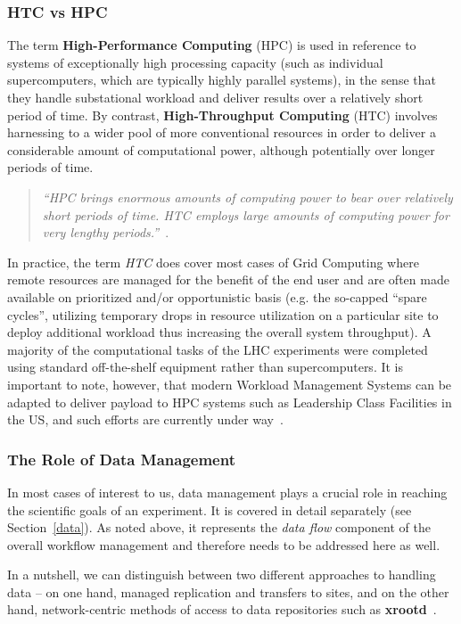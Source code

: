 \subsubsection{HTC vs HPC}
The term \textbf{High-Performance Computing} (HPC) is used in reference to systems of exceptionally high processing capacity (such as individual supercomputers, which are typically highly parallel systems),
in the sense that they handle substational workload and deliver results over a relatively short period of time. By contrast,\textbf{ High-Throughput Computing} (HTC) involves harnessing to a wider pool
of more conventional resources in order to deliver a considerable amount of computational power, although potentially over longer periods of time. 
\begin{quote}
\textit{``HPC brings enormous amounts of computing power to bear over relatively short periods of time. HTC employs large amounts of computing power for very lengthy periods.''}~\cite{htc}.
\end{quote}

In practice, the term \textit{HTC} does cover most cases of Grid Computing where remote resources are managed for the benefit of the end user and are often made available on prioritized and/or
opportunistic basis (e.g. the so-capped ``spare cycles'', utilizing temporary drops in resource utilization on a particular site to deploy additional workload thus increasing the overall system
throughput). A majority of the computational tasks of the LHC experiments were completed using standard off-the-shelf equipment rather than supercomputers. It is important to note, however,
that modern Workload Management Systems can be adapted to deliver payload to HPC systems such as Leadership Class Facilities in the US, and such efforts are currently under way~\cite{panda_chep13}.

\subsubsection{The Role of Data Management}
In most cases of interest to us, data management plays a crucial role in reaching the scientific goals of an experiment. It is covered in detail separately (see Section~\ref{data}).
As noted above, it represents the \textit{data flow} component of the overall workflow management and therefore needs to be addressed here as well.

In a nutshell, we can distinguish between two different approaches to handling data -- on one hand, managed replication and transfers to sites, and on the other hand, network-centric
methods of access to data repositories such as \textbf{xrootd}~\cite{xrootd,xrootd-web}.


